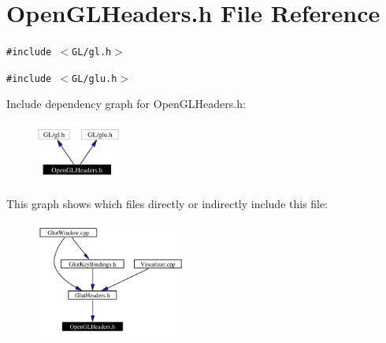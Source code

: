 \section{Open\-GLHeaders.h File Reference}
\label{OpenGLHeaders_8h}
{\tt \#include $<$GL/gl.h$>$}\par
{\tt \#include $<$GL/glu.h$>$}\par


Include dependency graph for Open\-GLHeaders.h:\begin{figure}[H]
\begin{center}
\leavevmode
\includegraphics[width=77pt]{OpenGLHeaders_8h__incl}
\end{center}
\end{figure}


This graph shows which files directly or indirectly include this file:\begin{figure}[H]
\begin{center}
\leavevmode
\includegraphics[width=137pt]{OpenGLHeaders_8h__dep__incl}
\end{center}
\end{figure}
